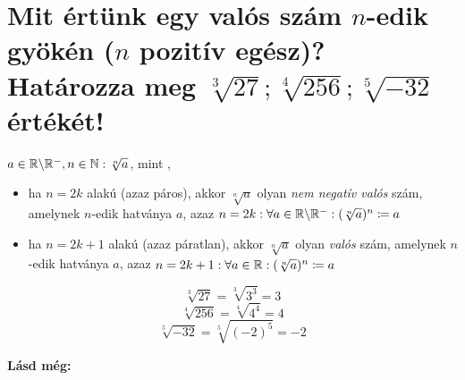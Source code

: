 \section{Mit értünk egy valós szám \texorpdfstring{$n$}{n}-edik gyökén 
  (\texorpdfstring{$n$}{n} pozitív egész)? Határozza meg 
  \texorpdfstring{$\sqrt[3]{27}; \sqrt[4]{256}; \sqrt[5]{-32}$}
  {27**(1/3); 256**(1/4); -32**(1/5)} értékét!}
\label{013}

\begin{defin}
$a \in \mathbb{R} \backslash \mathbb{R}^-, n \in \mathbb{N}: \sqrt[n]{a}$, mint
,
\begin{itemize}
  \item ha $n = 2k$ alakú (azaz páros), akkor $\sqrt[n]{a}$ olyan \emph{nem
    negatív valós} szám, amelynek $n$-edik hatványa $a$, azaz
    $n = 2k: \forall a \in \mathbb{R} \backslash \mathbb{R}^-: 
      (\sqrt[n]{a})^n \coloneqq a$
  \item ha $n = 2k+1$ alakú (azaz páratlan), akkor $\sqrt[n]{a}$ olyan 
    \emph{valós} szám, amelynek $n$-edik hatványa $a$, azaz
    $n = 2k + 1: \forall a \in \mathbb{R}: (\sqrt[n]{a})^n \coloneqq a$
\end{itemize}
\end{defin}

\[
  \sqrt[3]{27} = \sqrt[3]{3^3} = 3
\]
\[
  \sqrt[4]{256} = \sqrt[4]{4^4} = 4
\]
\[
  \sqrt[5]{-32} = \sqrt[5]{(-2)^5} = -2
\]

\textbf{Lásd még:}